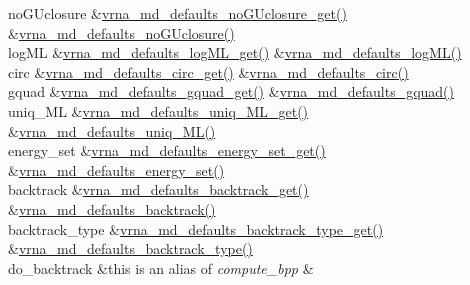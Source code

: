 \begin{DoxyRefList}
\begin{longtabu}
no\+G\+Uclosure &\hyperlink{group__model__details_ga4f7fdad083243a5348d63320ddaa70f3}{vrna\+\_\+md\+\_\+defaults\+\_\+no\+G\+Uclosure\+\_\+get()} &\hyperlink{group__model__details_gade5b9951d71ca2fb357a4e6c0c18ccd1}{vrna\+\_\+md\+\_\+defaults\+\_\+no\+G\+Uclosure()} \\
log\+ML &\hyperlink{group__model__details_ga93f04e070d529c5d0bb87c9681f6ad29}{vrna\+\_\+md\+\_\+defaults\+\_\+log\+M\+L\+\_\+get()} &\hyperlink{group__model__details_ga3de50a73455d88c3957386933b8e1f90}{vrna\+\_\+md\+\_\+defaults\+\_\+log\+M\+L()} \\
circ &\hyperlink{group__model__details_gad3a7e58de344ad93a08925f58f94f6fb}{vrna\+\_\+md\+\_\+defaults\+\_\+circ\+\_\+get()} &\hyperlink{group__model__details_ga4e1deb3e91a8a99e5c6dd905a5eb0186}{vrna\+\_\+md\+\_\+defaults\+\_\+circ()} \\
gquad &\hyperlink{group__model__details_gae645b8612f879eb38b45244fa9eddb9e}{vrna\+\_\+md\+\_\+defaults\+\_\+gquad\+\_\+get()} &\hyperlink{group__model__details_ga0685ca2aeb39af76f2421fc308163dce}{vrna\+\_\+md\+\_\+defaults\+\_\+gquad()} \\
uniq\+\_\+\+ML &\hyperlink{group__model__details_gab48e70fd024bf838404bcbcca0c874a0}{vrna\+\_\+md\+\_\+defaults\+\_\+uniq\+\_\+\+M\+L\+\_\+get()} &\hyperlink{group__model__details_ga59b944f61c5d2babec2d4c48c820de67}{vrna\+\_\+md\+\_\+defaults\+\_\+uniq\+\_\+\+M\+L()} \\
energy\+\_\+set &\hyperlink{group__model__details_ga017ed6afb1cba2b7f242412cab618b53}{vrna\+\_\+md\+\_\+defaults\+\_\+energy\+\_\+set\+\_\+get()} &\hyperlink{group__model__details_ga8dd29c55787a4576277e1907e92d810c}{vrna\+\_\+md\+\_\+defaults\+\_\+energy\+\_\+set()} \\
backtrack &\hyperlink{group__model__details_ga90da1156e6883ddd68527c2830706648}{vrna\+\_\+md\+\_\+defaults\+\_\+backtrack\+\_\+get()} &\hyperlink{group__model__details_ga978c468b2fe96a70d5191e3dd17d5599}{vrna\+\_\+md\+\_\+defaults\+\_\+backtrack()} \\
backtrack\+\_\+type &\hyperlink{group__model__details_ga1425b4ebd0e034dead66d79becd64143}{vrna\+\_\+md\+\_\+defaults\+\_\+backtrack\+\_\+type\+\_\+get()} &\hyperlink{group__model__details_ga68305274de96b56b7799575e222560d8}{vrna\+\_\+md\+\_\+defaults\+\_\+backtrack\+\_\+type()} \\
do\+\_\+backtrack &this is an alias of {\itshape compute\+\_\+bpp} &\\

\end{longtabu}
\end{DoxyRefList}
